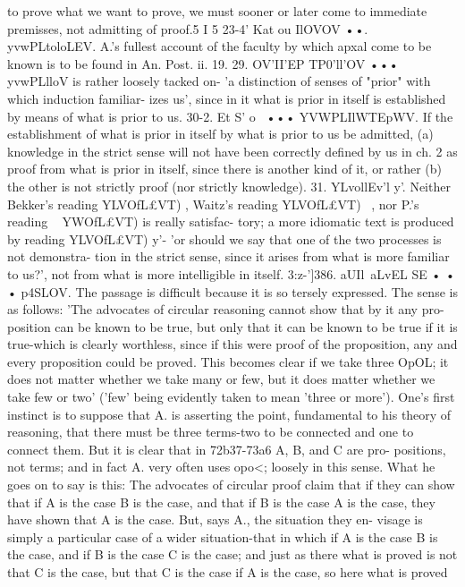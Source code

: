 {{{{{{{to prove what we want to prove, we must sooner or later come
to immediate premisses, not admitting of proof.5 I 5
23-4' Kat ou IlOVOV ••. yvwPLtoloLEV. A.'s fullest account of the
faculty by which apxal come to be known is to be found in An.
Post. ii. 19.
29. OV'II'EP TP0'll'OV ••• yvwPLlloV is rather loosely tacked on-
'a distinction of senses of "prior" with which induction familiar-
izes us', since in it what is prior in itself is established by means of
what is prior to us.
30-2. Et S' o\hw~ ••• YVWPLIlWTEpWV. If the establishment of
what is prior in itself by what is prior to us be admitted, (a)
knowledge in the strict sense will not have been correctly defined
by us in ch. 2 as proof from what is prior in itself, since there is
another kind of it, or rather (b) the other is not strictly proof
(nor strictly knowledge).
31. YLvollEv'l y'. Neither Bekker's reading YLVOfL£VT) , Waitz's
reading YLVOfL£VT) ~, nor P.'s reading ~ YWOfL£VT) is really satisfac-
tory; a more idiomatic text is produced by reading YLVOfL£VT) y'-
'or should we say that one of the two processes is not demonstra-
tion in the strict sense, since it arises from what is more familiar
to us?', not from what is more intelligible in itself.
3:z-']386. aUIl~aLvEL SE • • • p4SLOV. The passage is difficult
because it is so tersely expressed. The sense is as follows: 'The
advocates of circular reasoning cannot show that by it any pro-
position can be known to be true, but only that it can be known
to be true if it is true-which is clearly worthless, since if this
were proof of the proposition, any and every proposition could
be proved. This becomes clear if we take three OpOL; it does not
matter whether we take many or few, but it does matter whether
we take few or two' ('few' being evidently taken to mean 'three
or more'). One's first instinct is to suppose that A. is asserting
the point, fundamental to his theory of reasoning, that there
must be three terms-two to be connected and one to connect
them. But it is clear that in 72b37-73a6 A, B, and C are pro-
positions, not terms; and in fact A. very often uses opo<; loosely in
this sense. What he goes on to say is this: The advocates of
circular proof claim that if they can show that if A is the case
B is the case, and that if B is the case A is the case, they have
shown that A is the case. But, says A., the situation they en-
visage is simply a particular case of a wider situation-that in
which if A is the case B is the case, and if B is the case C is the
case; and just as there what is proved is not that C is the case,
but that C is the case if A is the case, so here what is proved
}}}}}}}
